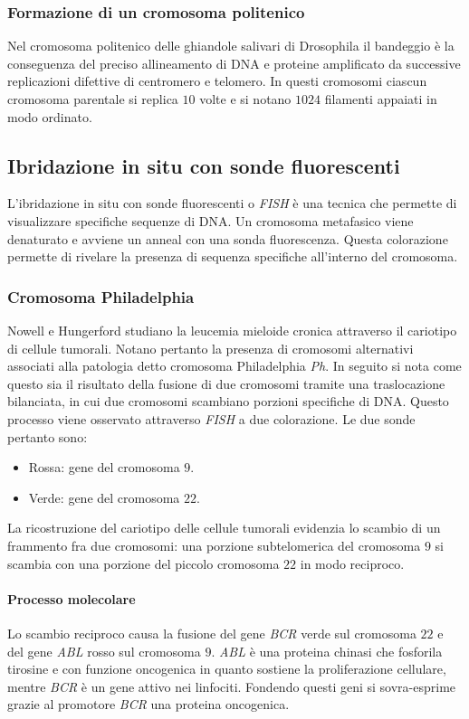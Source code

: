 		\subsubsection{Formazione di un cromosoma politenico}
		Nel cromosoma politenico delle ghiandole salivari di Drosophila il bandeggio \`e la conseguenza del preciso allineamento di DNA e proteine amplificato da successive replicazioni difettive di centromero e telomero.
		In questi cromosomi ciascun cromosoma parentale si replica $10$ volte e si notano $1024$ filamenti appaiati in modo ordinato.

	\subsection{Ibridazione in situ con sonde fluorescenti}
	L'ibridazione in situ con sonde fluorescenti o \emph{FISH} \`e una tecnica che permette di visualizzare specifiche sequenze di DNA.
	Un cromosoma metafasico viene denaturato e avviene un anneal con una sonda fluorescenza.
	Questa colorazione permette di rivelare la presenza di sequenza specifiche all'interno del cromosoma.

		\subsubsection{Cromosoma Philadelphia}
		Nowell e Hungerford studiano la leucemia mieloide cronica attraverso il cariotipo di cellule tumorali.
		Notano pertanto la presenza di cromosomi alternativi associati alla patologia detto cromosoma Philadelphia \emph{Ph}.
		In seguito si nota come questo sia il risultato della fusione di due cromosomi tramite una traslocazione bilanciata, in cui due cromosomi scambiano porzioni specifiche di DNA.
		Questo processo viene osservato attraverso \emph{FISH} a due colorazione.
		Le due sonde pertanto sono:
		\begin{multicols}{2}
			\begin{itemize}
				\item Rossa: gene del cromosoma $9$.
				\item Verde: gene del cromosoma $22$.
			\end{itemize}
		\end{multicols}
		La ricostruzione del cariotipo delle cellule tumorali evidenzia lo scambio di un frammento fra due cromosomi: una porzione subtelomerica del cromosoma $9$ si scambia con una porzione del piccolo cromosoma $22$ in modo reciproco.

			\paragraph{Processo molecolare}
			Lo scambio reciproco causa la fusione del gene \emph{BCR} verde sul cromosoma $22$ e del gene \emph{ABL} rosso sul cromosoma $9$.
			\emph{ABL} \`e una proteina chinasi che fosforila tirosine e con funzione oncogenica in quanto sostiene la proliferazione cellulare, mentre \emph{BCR} \`e un gene attivo nei linfociti.
			Fondendo questi geni si sovra-esprime grazie al promotore \emph{BCR} una proteina oncogenica.


